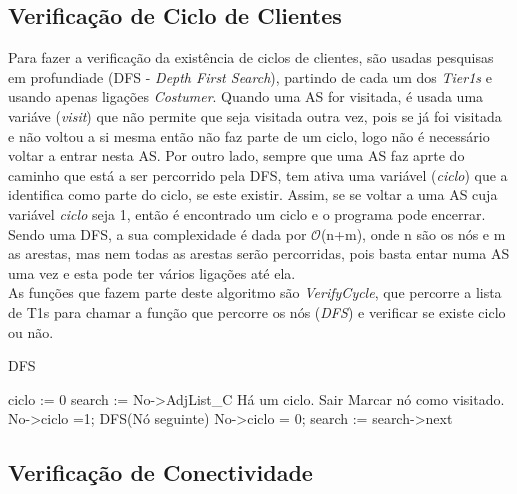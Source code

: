 \documentclass[twocolumn]{article} %
\begin{document}
		\subsection{Verificação de Ciclo de Clientes}

			Para fazer a verificação da existência de ciclos de clientes, são usadas pesquisas em profundiade (DFS - \emph{Depth First Search}), partindo de cada um dos \emph{Tier1s} e usando apenas ligações \emph{Costumer}. Quando uma AS for visitada, é usada uma variáve (\emph{visit}) que não permite que seja visitada outra vez, pois se já foi visitada e não voltou a si mesma então não faz parte de um ciclo, logo não é necessário voltar a entrar nesta AS. Por outro lado, sempre que uma AS faz aprte do caminho que está a ser percorrido pela DFS, tem ativa uma variável (\emph{ciclo}) que a identifica como parte do ciclo, se este existir. Assim, se se voltar a uma AS cuja variável \emph{ciclo} seja 1, então é encontrado um ciclo e o programa pode encerrar. Sendo uma DFS, a sua complexidade é dada por $\mathcal{O}$(n+m), onde n são os nós e m as arestas, mas nem todas as arestas serão percorridas, pois basta entar numa AS uma vez e esta pode ter vários ligações até ela.\\

			\noindent As funções que fazem parte deste algoritmo são \emph{VerifyCycle}, que percorre a lista de T1s para chamar a função que percorre os nós (\emph{DFS}) e verificar se existe ciclo ou não. 

			\begin{algorithm}[htbp]
			\caption{DFS}
			\begin{algorithmic}[1]
				\State ciclo := 0 
				\State search := No->AdjList\_C
						\State Há um ciclo. Sair
					\Else
						\State Marcar nó como visitado.
						\State No->ciclo =1;
						\State DFS(Nó seguinte)
						\State No->ciclo = 0;
					\EndIf
					\State search := search->next

				\EndWhile
			\end{algorithmic}
			\end{algorithm}

		\subsection{Verificação de Conectividade}
\end{document}
